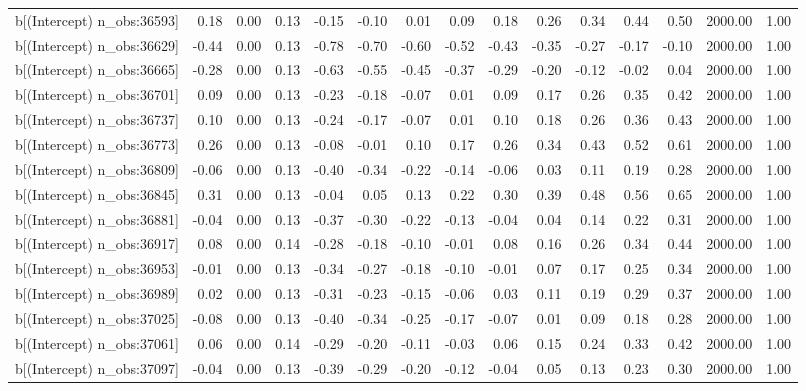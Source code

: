 \begin{table}[ht]
\begin{tabular}{rrrrrrrrrrrrrrr}
  b[(Intercept) n\_obs:36593] & 0.18 & 0.00 & 0.13 & -0.15 & -0.10 & 0.01 & 0.09 & 0.18 & 0.26 & 0.34 & 0.44 & 0.50 & 2000.00 & 1.00 \\ 
  b[(Intercept) n\_obs:36629] & -0.44 & 0.00 & 0.13 & -0.78 & -0.70 & -0.60 & -0.52 & -0.43 & -0.35 & -0.27 & -0.17 & -0.10 & 2000.00 & 1.00 \\ 
  b[(Intercept) n\_obs:36665] & -0.28 & 0.00 & 0.13 & -0.63 & -0.55 & -0.45 & -0.37 & -0.29 & -0.20 & -0.12 & -0.02 & 0.04 & 2000.00 & 1.00 \\ 
  b[(Intercept) n\_obs:36701] & 0.09 & 0.00 & 0.13 & -0.23 & -0.18 & -0.07 & 0.01 & 0.09 & 0.17 & 0.26 & 0.35 & 0.42 & 2000.00 & 1.00 \\ 
  b[(Intercept) n\_obs:36737] & 0.10 & 0.00 & 0.13 & -0.24 & -0.17 & -0.07 & 0.01 & 0.10 & 0.18 & 0.26 & 0.36 & 0.43 & 2000.00 & 1.00 \\ 
  b[(Intercept) n\_obs:36773] & 0.26 & 0.00 & 0.13 & -0.08 & -0.01 & 0.10 & 0.17 & 0.26 & 0.34 & 0.43 & 0.52 & 0.61 & 2000.00 & 1.00 \\ 
  b[(Intercept) n\_obs:36809] & -0.06 & 0.00 & 0.13 & -0.40 & -0.34 & -0.22 & -0.14 & -0.06 & 0.03 & 0.11 & 0.19 & 0.28 & 2000.00 & 1.00 \\ 
  b[(Intercept) n\_obs:36845] & 0.31 & 0.00 & 0.13 & -0.04 & 0.05 & 0.13 & 0.22 & 0.30 & 0.39 & 0.48 & 0.56 & 0.65 & 2000.00 & 1.00 \\ 
  b[(Intercept) n\_obs:36881] & -0.04 & 0.00 & 0.13 & -0.37 & -0.30 & -0.22 & -0.13 & -0.04 & 0.04 & 0.14 & 0.22 & 0.31 & 2000.00 & 1.00 \\ 
  b[(Intercept) n\_obs:36917] & 0.08 & 0.00 & 0.14 & -0.28 & -0.18 & -0.10 & -0.01 & 0.08 & 0.16 & 0.26 & 0.34 & 0.44 & 2000.00 & 1.00 \\ 
  b[(Intercept) n\_obs:36953] & -0.01 & 0.00 & 0.13 & -0.34 & -0.27 & -0.18 & -0.10 & -0.01 & 0.07 & 0.17 & 0.25 & 0.34 & 2000.00 & 1.00 \\ 
  b[(Intercept) n\_obs:36989] & 0.02 & 0.00 & 0.13 & -0.31 & -0.23 & -0.15 & -0.06 & 0.03 & 0.11 & 0.19 & 0.29 & 0.37 & 2000.00 & 1.00 \\ 
  b[(Intercept) n\_obs:37025] & -0.08 & 0.00 & 0.13 & -0.40 & -0.34 & -0.25 & -0.17 & -0.07 & 0.01 & 0.09 & 0.18 & 0.28 & 2000.00 & 1.00 \\ 
  b[(Intercept) n\_obs:37061] & 0.06 & 0.00 & 0.14 & -0.29 & -0.20 & -0.11 & -0.03 & 0.06 & 0.15 & 0.24 & 0.33 & 0.42 & 2000.00 & 1.00 \\ 
  b[(Intercept) n\_obs:37097] & -0.04 & 0.00 & 0.13 & -0.39 & -0.29 & -0.20 & -0.12 & -0.04 & 0.05 & 0.13 & 0.23 & 0.30 & 2000.00 & 1.00 \\ 

\end{tabular}
\end{table}
